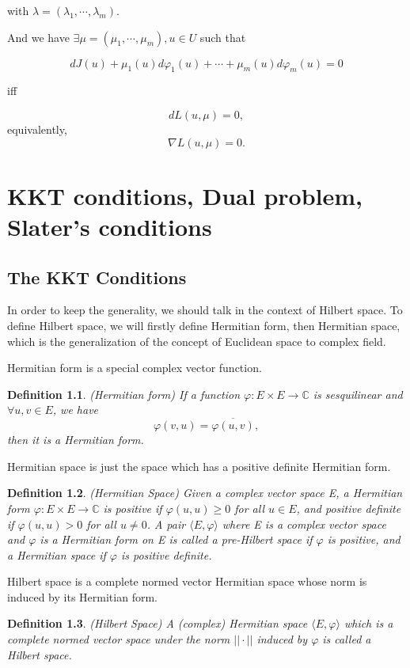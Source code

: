 \documentclass[a4paper,12pt]{report}
\newtheorem{definition}{Definition}[section]
\begin{document}
with $\lambda=(\lambda_1,\cdots,\lambda_m)$. 

And we have $\exists \mu=(\mu_1,\cdots,\mu_m), u\in U$ such that

\[
    dJ(u)+\mu_1(u)d\varphi_1(u)+\cdots+\mu_m(u)d\varphi_m(u)=0
\]

iff

\[
    dL(u,\mu)=0,
\]
equivalently,
\[
    \nabla L(u,\mu)=0.
\]


\chapter{KKT conditions, Dual problem, Slater's conditions}
\section{The KKT Conditions}
In order to keep the generality, we should talk in the context of Hilbert space. To define Hilbert space, we will firstly define Hermitian form, then Hermitian space, which is the generalization of the concept of Euclidean space to complex field.

Hermitian form is a special complex vector function.
\begin{definition}
    (Hermitian form\cite{gallier2019algebra}) If a function $\varphi :E\times E\to \mathbb C$ is sesquilinear and $\forall u,v\in E$, we have 
    \[
        \varphi(v,u)=\overline{\varphi(u,v)},
    \]
    then it is a Hermitian form.
\end{definition}

Hermitian space is just the space which has a positive definite Hermitian form.

\begin{definition}
    (Hermitian Space\cite{gallier2019algebra}) Given a complex vector space E, a Hermitian form $\varphi:E\times E\to \mathbb C$ is positive if $\varphi(u,u)\geq 0$ for all $u\in E$, and positive definite if $\varphi(u,u)>0$ for all $u\neq 0$. A pair $\langle E,\varphi \rangle$ where E is a complex vector space and $\varphi$ is a Hermitian form on E is called a pre-Hilbert space if $\varphi$ is positive, and a Hermitian space if $\varphi$ is positive definite.
\end{definition}

Hilbert space is a complete normed vector Hermitian space whose norm is induced by its Hermitian form.

\begin{definition}
    (Hilbert Space\cite{gallier2019algebra}) A (complex) Hermitian space $\langle E,\varphi \rangle$ which is a complete normed vector space under the norm $||\cdot||$ induced by $\varphi$ is called a Hilbert space.
\end{definition}
\end{document}
